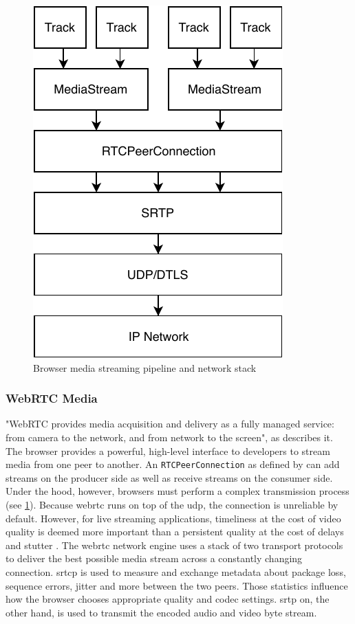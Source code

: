 \begin{figure}
\centering
\includegraphics[width=.5\textwidth]{graphics/media-stream-pipeline.pdf}
\caption{Browser media streaming pipeline and network stack}
\label{fig:pipeline}
\end{figure}

\subsubsection{WebRTC Media}
\label{subsec:webrtc-media}

"WebRTC provides media acquisition and delivery as a fully managed service: from camera to the network, and from network to the screen", as \citet[\S18.5]{high-performance-browser-networking} describes it. The browser provides a powerful, high-level interface to developers to stream media from one peer to another. An \lstinline|RTCPeerConnection| as defined by \citet[\S4.4]{webrtc-w3c} can add streams on the producer side as well as receive streams on the consumer side. Under the hood, however, browsers must perform a complex transmission process (see \cref{fig:pipeline}). Because \gls{webrtc} runs on top of the \gls{udp}, the connection is unreliable by default. However, for live streaming applications, timeliness at the cost of video quality is deemed more important than a persistent quality at the cost of delays and stutter \cite[\S18.3]{high-performance-browser-networking}. The \gls{webrtc} network engine uses a stack of two transport protocols to deliver the best possible media stream across a constantly changing connection. \Gls{srtcp} is used to measure and exchange metadata about package loss, sequence errors, jitter and more between the two peers. Those statistics influence how the browser chooses appropriate quality and codec settings. \gls{srtp} on, the other hand, is used to transmit the encoded audio and video byte stream.

